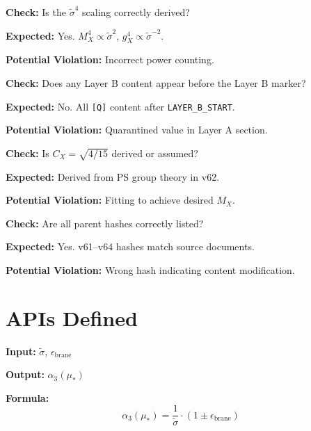 \documentclass[11pt,a4paper]{article}
\newcommand{\tagQ}{\textcolor{red!70!black}{\texttt{[Q]}}}
\theoremstyle{definition}
\begin{document}
\begin{trapbox}
\textbf{Check:} Is the $\tilde{\sigma}^4$ scaling correctly derived?

\textbf{Expected:} Yes. $M_X^4 \propto \tilde{\sigma}^2$, $g_X^4 \propto \tilde{\sigma}^{-2}$.

\textbf{Potential Violation:} Incorrect power counting.
\end{trapbox}

\begin{trapbox}
\textbf{Check:} Does any Layer B content appear before the Layer B marker?

\textbf{Expected:} No. All \tagQ{} content after \texttt{LAYER\_B\_START}.

\textbf{Potential Violation:} Quarantined value in Layer A section.
\end{trapbox}

\begin{trapbox}
\textbf{Check:} Is $C_X = \sqrt{4/15}$ derived or assumed?

\textbf{Expected:} Derived from PS group theory in v62.

\textbf{Potential Violation:} Fitting to achieve desired $M_X$.
\end{trapbox}

\begin{trapbox}
\textbf{Check:} Are all parent hashes correctly listed?

\textbf{Expected:} Yes. v61--v64 hashes match source documents.

\textbf{Potential Violation:} Wrong hash indicating content modification.
\end{trapbox}


\section{APIs Defined}
\label{sec:apis}

\begin{apibox}
\textbf{Input:} $\tilde{\sigma}$, $\epsilon_{\text{brane}}$

\textbf{Output:} $\alpha_3(\mu_*)$

\textbf{Formula:}
\begin{equation}
\label{eq:api-alpha3}
\alpha_3(\mu_*) = \frac{1}{\tilde{\sigma}} \cdot (1 \pm \epsilon_{\text{brane}})
\end{equation}
\end{apibox}
\end{document}
